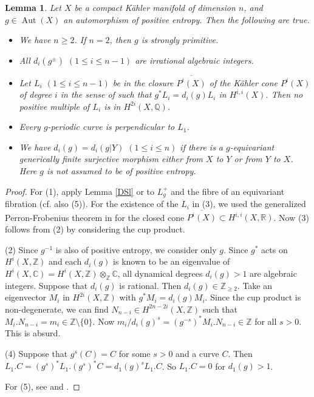 \documentclass[11pt,a4paper,psamsfonts]{amsart}
\theoremstyle{plain}
\newtheorem{lemma}[thm]{Lemma}
\theoremstyle{definition}
\theoremstyle{remark}
\begin{document}
\begin{lemma}\label{irrat}
Let $X$ be a compact K\"ahler manifold of dimension $n$,
and $g \in {\operatorname{Aut}}(X)$ an automorphism of positive entropy.
Then the following are true.
\begin{itemize}
\item[(1)]
We have $n \ge 2$. If $n = 2$, then
$g$ is strongly primitive.
\item[(2)]
All $d_i(g^{\pm})$ $(1 \le i \le n-1)$ are irrational algebraic integers.
\item[(3)]
Let $L_i$ $(1 \le i \le n-1)$ be in the closure $\overline{P^i(X)}$ of the K\"ahler cone 
$P^i(X)$ of degree $i$
in the sense of \cite[Appendix A, Lemma A.9, the definition before Lemma A.3]{NZ}
such that $g^*L_i = d_i(g) L_i$ in $H^{i,i}(X)$. Then
no positive multiple of $L_i$ is in $H^{2i}(X, {\mathbb{Q}})$.
\item[(4)]
Every $g$-periodic curve is perpendicular to $L_1$.
\item[(5)]
We have $d_i(g) = d_i(g|Y)$ $(1 \le i \le n)$ if there is a $g$-equivariant
generically finite surjective morphism either from $X$ to $Y$ or
from $Y$ to $X$.
Here $g$ is not assumed to be of positive entropy.
\end{itemize}
\end{lemma}

\begin{proof}
For (1), apply Lemma \ref{DSl} or \cite[Lemma 2.12]{Z1}
to $L_g^+$ and the fibre of an equivariant fibration (cf. also (5)).
For the existence of the $L_i$ in (3), we used the generalized Perron-Frobenius theorem 
in \cite{Bi} for the closed cone $\overline{P^i(X)} \subset H^{i, i}(X, {\mathbb{R}})$.
Now (3) follows from (2) by considering the cup product.

(2) Since $g^{-1}$ is also of positive entropy, we consider only $g$.
Since $g^*$ acts on $H^i(X, {\mathbb{Z}})$ and each $d_i(g)$ is known to be an eigenvalue
of $H^i(X, {\mathbb{C}}) = H^i(X, {\mathbb{Z}}) \otimes_{\mathbb{Z}} {\mathbb{C}}$, all
dynamical degrees $d_i(g) > 1$ are algebraic integers.
Suppose that $d_i(g)$ is rational. Then $d_i(g) \in {\mathbb{Z}}_{\ge 2}$.
Take an eigenvector $M_i$ in $H^{2i}(X, {\mathbb{Z}})$ with $g^*M_i = d_i(g)M_i$.
Since the cup product is non-degenerate, we can find $N_{n-i} \in H^{2n-2i}(X, {\mathbb{Z}})$
such that $M_i . N_{n-i} = m_i \in {\mathbb{Z}} \setminus \{0\}$.
Now $m_i/d_i(g)^s = (g^{-s})^*M_i . N_{n-i} \in {\mathbb{Z}}$
for all $s > 0$. This is absurd.

(4) Suppose that $g^s(C) = C$ for some $s > 0$ and a curve $C$. Then
$L_1 . C = (g^s)^*L_1 . (g^s)^*C = d_1(g)^s L_1 . C$.
So $L_1 . C = 0$ for $d_1(g) > 1$.

For (5), see \cite[Lemma 2.6]{Z2} and \cite[Appendix A, Lemma A.8]{NZ}.
\end{proof}
\end{document}
